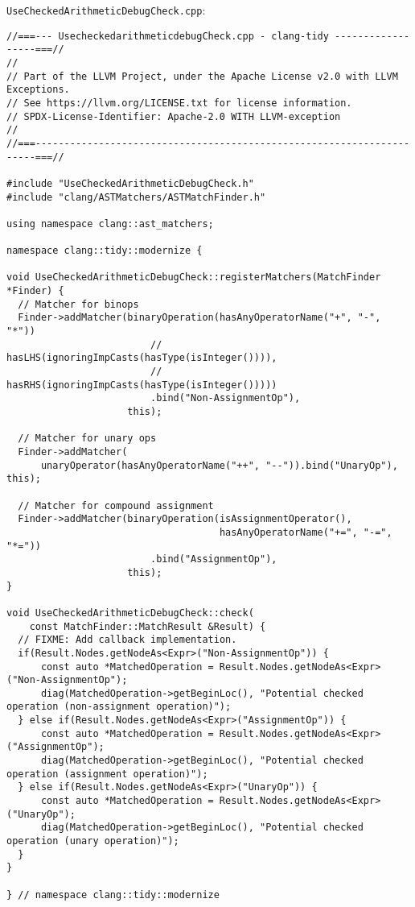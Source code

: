\texttt{UseCheckedArithmeticDebugCheck.cpp}:
{\scriptsize
\begin{verbatim}
//===--- UsecheckedarithmeticdebugCheck.cpp - clang-tidy ------------------===//
//
// Part of the LLVM Project, under the Apache License v2.0 with LLVM Exceptions.
// See https://llvm.org/LICENSE.txt for license information.
// SPDX-License-Identifier: Apache-2.0 WITH LLVM-exception
//
//===----------------------------------------------------------------------===//

#include "UseCheckedArithmeticDebugCheck.h"
#include "clang/ASTMatchers/ASTMatchFinder.h"

using namespace clang::ast_matchers;

namespace clang::tidy::modernize {

void UseCheckedArithmeticDebugCheck::registerMatchers(MatchFinder *Finder) {
  // Matcher for binops
  Finder->addMatcher(binaryOperation(hasAnyOperatorName("+", "-", "*"))
                         // hasLHS(ignoringImpCasts(hasType(isInteger()))),
                         // hasRHS(ignoringImpCasts(hasType(isInteger()))))
                         .bind("Non-AssignmentOp"),
                     this);

  // Matcher for unary ops
  Finder->addMatcher(
      unaryOperator(hasAnyOperatorName("++", "--")).bind("UnaryOp"), this);

  // Matcher for compound assignment
  Finder->addMatcher(binaryOperation(isAssignmentOperator(),
                                     hasAnyOperatorName("+=", "-=", "*="))
                         .bind("AssignmentOp"),
                     this);
}

void UseCheckedArithmeticDebugCheck::check(
    const MatchFinder::MatchResult &Result) {
  // FIXME: Add callback implementation.
  if(Result.Nodes.getNodeAs<Expr>("Non-AssignmentOp")) {
	  const auto *MatchedOperation = Result.Nodes.getNodeAs<Expr>("Non-AssignmentOp");
	  diag(MatchedOperation->getBeginLoc(), "Potential checked operation (non-assignment operation)");
  } else if(Result.Nodes.getNodeAs<Expr>("AssignmentOp")) {
	  const auto *MatchedOperation = Result.Nodes.getNodeAs<Expr>("AssignmentOp");
	  diag(MatchedOperation->getBeginLoc(), "Potential checked operation (assignment operation)");
  } else if(Result.Nodes.getNodeAs<Expr>("UnaryOp")) {
	  const auto *MatchedOperation = Result.Nodes.getNodeAs<Expr>("UnaryOp");
	  diag(MatchedOperation->getBeginLoc(), "Potential checked operation (unary operation)");
  }
}

} // namespace clang::tidy::modernize
\end{verbatim}
}

